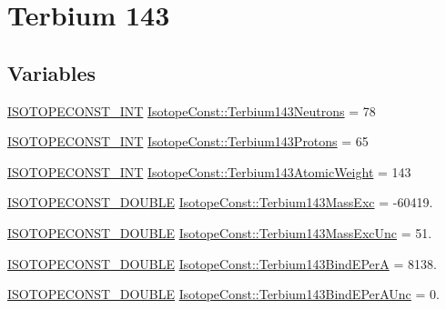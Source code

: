 \hypertarget{group___isotope_const-_terbium-_tb143}{}\section{Terbium 143}
\label{group___isotope_const-_terbium-_tb143}
\subsection*{Variables}
\begin{DoxyCompactItemize}
\item 
\mbox{\hyperlink{group___isotope_const-_macros_ga5f18360b3e99483a35c32d789e62621c}{I\+S\+O\+T\+O\+P\+E\+C\+O\+N\+S\+T\+\_\+\+I\+NT}} \mbox{\hyperlink{group___isotope_const-_terbium-_tb143_gaabe11c841d8ff3991c0e244a3daa81ce}{Isotope\+Const\+::\+Terbium143\+Neutrons}} = 78
\item 
\mbox{\hyperlink{group___isotope_const-_macros_ga5f18360b3e99483a35c32d789e62621c}{I\+S\+O\+T\+O\+P\+E\+C\+O\+N\+S\+T\+\_\+\+I\+NT}} \mbox{\hyperlink{group___isotope_const-_terbium-_tb143_ga805dfd6540415f387d7bd98639777bd0}{Isotope\+Const\+::\+Terbium143\+Protons}} = 65
\item 
\mbox{\hyperlink{group___isotope_const-_macros_ga5f18360b3e99483a35c32d789e62621c}{I\+S\+O\+T\+O\+P\+E\+C\+O\+N\+S\+T\+\_\+\+I\+NT}} \mbox{\hyperlink{group___isotope_const-_terbium-_tb143_gaa0a4c1f261077075426ef7d43d866214}{Isotope\+Const\+::\+Terbium143\+Atomic\+Weight}} = 143
\item 
\mbox{\hyperlink{group___isotope_const-_macros_ga8f45a7272ce02c0b4c65c44636ed719a}{I\+S\+O\+T\+O\+P\+E\+C\+O\+N\+S\+T\+\_\+\+D\+O\+U\+B\+LE}} \mbox{\hyperlink{group___isotope_const-_terbium-_tb143_ga5f356f126a2cceb1d12525a8803f1d22}{Isotope\+Const\+::\+Terbium143\+Mass\+Exc}} = -\/60419.
\item 
\mbox{\hyperlink{group___isotope_const-_macros_ga8f45a7272ce02c0b4c65c44636ed719a}{I\+S\+O\+T\+O\+P\+E\+C\+O\+N\+S\+T\+\_\+\+D\+O\+U\+B\+LE}} \mbox{\hyperlink{group___isotope_const-_terbium-_tb143_ga6fb3ab9cdde519c2527571adc0c3db56}{Isotope\+Const\+::\+Terbium143\+Mass\+Exc\+Unc}} = 51.
\item 
\mbox{\hyperlink{group___isotope_const-_macros_ga8f45a7272ce02c0b4c65c44636ed719a}{I\+S\+O\+T\+O\+P\+E\+C\+O\+N\+S\+T\+\_\+\+D\+O\+U\+B\+LE}} \mbox{\hyperlink{group___isotope_const-_terbium-_tb143_ga698a91000844446280f6b9cf56de712d}{Isotope\+Const\+::\+Terbium143\+Bind\+E\+PerA}} = 8138.
\item 
\mbox{\hyperlink{group___isotope_const-_macros_ga8f45a7272ce02c0b4c65c44636ed719a}{I\+S\+O\+T\+O\+P\+E\+C\+O\+N\+S\+T\+\_\+\+D\+O\+U\+B\+LE}} \mbox{\hyperlink{group___isotope_const-_terbium-_tb143_ga808f25a34373b6bec7d84b87157018ce}{Isotope\+Const\+::\+Terbium143\+Bind\+E\+Per\+A\+Unc}} = 0.

\end{DoxyCompactItemize}
